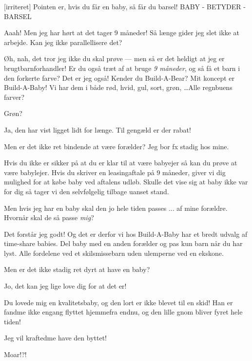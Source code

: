 \documentclass[a4paper,11pt]{article}
\begin{document}
\begin{sketch}
[irriteret] Pointen er, hvis du får en baby, så får du barsel! BABY - BETYDER - BARSEL

 Aaah! Men jeg har hørt at det tager 9 måneder! Så længe gider jeg slet
ikke at arbejde.  Kan jeg ikke parallellisere det?

 Øh, nah, det tror jeg ikke du skal prøve --- men så er det heldigt at
jeg er brugtbarnforhandler!  Er du også træt af at bruge
\emph{9 måneder}, og så få et barn i den forkerte farve? Det er jeg også!
Kender du Build-A-Bear? Mit koncept er Build-A-Baby!    Vi har dem i både rød, hvid, gul, sort, grøn, \ldots Alle regnbuens
farver?

 Grøn?

 Ja, den har vist ligget lidt for længe. Til gengæld er der rabat!

 Men er det ikke ret bindende at være forælder? Jeg bor fx stadig hos mine.

 Hvis du ikke er sikker på at du er klar til at være babyejer så kan du prøve at være babylejer.
Hvis du skriver en leasingaftale på 9 måneder, giver vi dig mulighed for at købe baby ved aftalens udløb.  Skulle det
vise sig at baby ikke var for dig så tager vi den selvfølgelig tilbage uanset stand.

 Men hvis jeg har en baby skal den jo hele tiden passes ... af mine forældre.
Hvornår skal de så passe \emph{mig}?

 Det forstår jeg godt! Og det er derfor vi hos Build-A-Baby har et bredt
udvalg af time-share babies. Del baby med en anden forælder og pas kun barn når
du har lyst. Alle fordelene ved et skilsmissebarn uden ulemperne ved en ekskone.

 Men er det ikke stadig ret dyrt at have en baby?


 Jo, det kan jeg lige love dig for at det er!

 Du lovede mig en kvalitetsbaby, og den lort er ikke blevet til en skid! Han er fandme ikke engang flyttet hjemmefra endnu, og den lille gnom bliver fyret hele tiden!

 Jeg vil kraftedme have den byttet!

 Moar!?!



\end{sketch}
\end{document}
